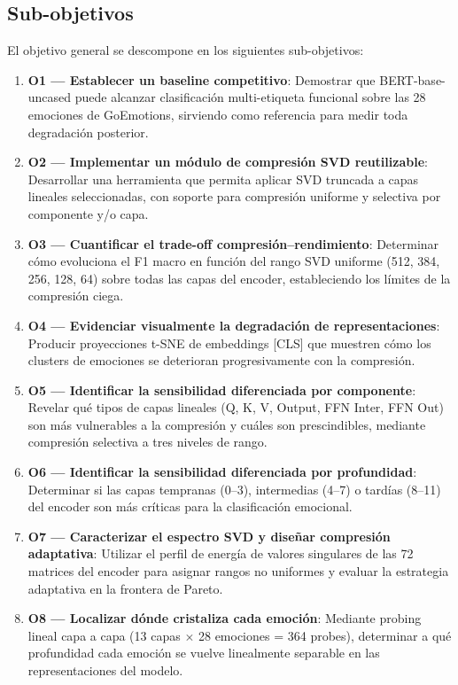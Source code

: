 \documentclass[11pt, a4paper]{article}
\begin{document}
\subsection{Sub-objetivos}
\label{sec:subobjetivos}

El objetivo general se descompone en los siguientes sub-objetivos:

\begin{enumerate}[nosep]
    \item \textbf{O1 --- Establecer un baseline competitivo}: Demostrar que BERT-base-uncased puede alcanzar clasificación multi-etiqueta funcional sobre las 28 emociones de GoEmotions, sirviendo como referencia para medir toda degradación posterior.
    \item \textbf{O2 --- Implementar un módulo de compresión SVD reutilizable}: Desarrollar una herramienta que permita aplicar SVD truncada a capas lineales seleccionadas, con soporte para compresión uniforme y selectiva por componente y/o capa.
    \item \textbf{O3 --- Cuantificar el trade-off compresión--rendimiento}: Determinar cómo evoluciona el F1 macro en función del rango SVD uniforme (512, 384, 256, 128, 64) sobre todas las capas del encoder, estableciendo los límites de la compresión ciega.
    \item \textbf{O4 --- Evidenciar visualmente la degradación de representaciones}: Producir proyecciones t-SNE de embeddings [CLS] que muestren cómo los clusters de emociones se deterioran progresivamente con la compresión.
    \item \textbf{O5 --- Identificar la sensibilidad diferenciada por componente}: Revelar qué tipos de capas lineales (Q, K, V, Output, FFN Inter, FFN Out) son más vulnerables a la compresión y cuáles son prescindibles, mediante compresión selectiva a tres niveles de rango.
    \item \textbf{O6 --- Identificar la sensibilidad diferenciada por profundidad}: Determinar si las capas tempranas (0--3), intermedias (4--7) o tardías (8--11) del encoder son más críticas para la clasificación emocional.
    \item \textbf{O7 --- Caracterizar el espectro SVD y diseñar compresión adaptativa}: Utilizar el perfil de energía de valores singulares de las 72 matrices del encoder para asignar rangos no uniformes y evaluar la estrategia adaptativa en la frontera de Pareto.
    \item \textbf{O8 --- Localizar dónde cristaliza cada emoción}: Mediante probing lineal capa a capa (13 capas $\times$ 28 emociones = 364 probes), determinar a qué profundidad cada emoción se vuelve linealmente separable en las representaciones del modelo.

\end{enumerate}
\end{document}
